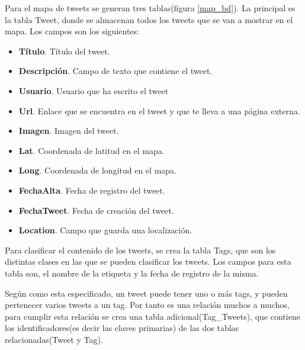 \vspace{5 mm}

Para el mapa de tweets se generan tres tablas(figura \ref{map_bd}). La principal es la tabla Tweet, donde se almacenan todos los tweets que se van a mostrar en el mapa. Los campos son los siguientes:


\begin{itemize}

\item \textbf{Título}. Título del tweet.
\item \textbf{Descripción}. Campo de texto que contiene el tweet.
\item \textbf{Usuario}. Usuario que ha escrito el tweet
\item \textbf{Url}. Enlace que se encuentra en el tweet y que te lleva a una página externa.
\item \textbf{Imagen}. Imagen del tweet.
\item \textbf{Lat}. Coordenada de latitud en el mapa.
\item \textbf{Long}. Coordenada de longitud en el mapa.
\item \textbf{FechaAlta}. Fecha de registro del tweet.
\item \textbf{FechaTweet}. Fecha de creación del tweet.
\item \textbf{Location}. Campo que guarda una localización.

\end{itemize}


\vspace{5 mm}


Para clasificar el contenido de los tweets, se crea la tabla Tags, que son los distintas clases en las que se pueden clasificar los tweets. Los campos para esta tabla son, el nombre de la etiqueta y la fecha de registro de la misma.

\vspace{5 mm}

Según como esta especificado, un tweet puede tener uno o más tags, y pueden pertenecer varios tweets a un tag. Por tanto es una relación muchos a muchos, para cumplir esta relación se crea una tabla adicional(Tag\_Tweets), que contiene los identificadores(es decir las claves primarias) de las dos tablas relacionadas(Tweet y Tag).

